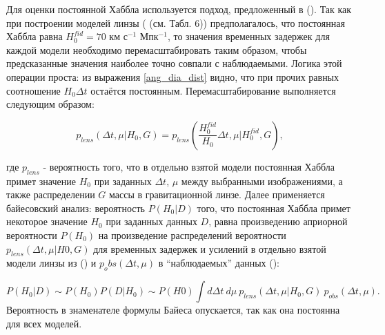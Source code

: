 Для оценки постоянной Хаббла используется подход, предложенный в (\cite{vegaferrero}). Так как при построении моделей линзы (\cite{treu2016} (см. Табл. 6)) предполагалось, что постоянная Хаббла равна $H_0^{fid} = 70$ км с$^{-1}$ Мпк$^{-1}$, то значения временных задержек для каждой модели необходимо перемасштабировать таким образом, чтобы предсказанные значения наиболее точно совпали с наблюдаемыми. Логика этой операции проста: из выражения \eqref{ang_dia_dist} видно, что при прочих равных соотношение $H_0\Delta t$ остаётся постоянным. Перемасштабирование выполняется следующим образом:

\begin{equation}
p_{lens}(\Delta t, \mu | H_0, G) = p_{lens}(\frac{H_0^{fid}}{H_0} \Delta t, \mu | H_0^{fid}, G), 
\end{equation}

где $p_{lens}$  - вероятность того, что в отдельно взятой модели постоянная Хаббла примет значение $H_0$ при заданных $\Delta t$, $\mu$ между выбранными изображениями, а также распределении $G$ массы в гравитационной линзе. Далее применяется байесовский анализ: вероятность $P( H_0 |D)$ того, что постоянная Хаббла примет некоторое значение $H_0$ при заданных данных $D$, равна произведению априорной вероятности $P(H_0)$ на произведение распределений вероятности $p_{lens}(\Delta t, \mu| H0, G)$ для временных задержек и усилений в отдельно взятой модели линзы из (\cite{treu2016}) и $p_obs(\Delta t, \mu)$ в “наблюдаемых” данных (\cite{petrnat2020}): 

\begin{equation}
P( H_0 |D) \sim P(H_0) P( D | H_0 ) \sim P(H0) \int d \Delta t \ d \mu \ p_{lens}(\Delta t, \mu| H_0, G) \ p_{obs}(\Delta t, \mu).
\end{equation}
Вероятность в знаменателе формулы Байеса опускается, так как она постоянна для всех моделей.